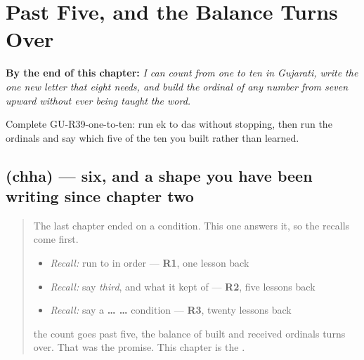 
\chapter{Past Five, and the Balance Turns Over}
\label{ch:gu-six-to-ten}

\begin{chapteropening}
\textbf{By the end of this chapter:} \emph{I can count from one to ten in Gujarati, write the one new letter that eight needs, and build the ordinal of any number from seven upward without ever being taught the word.}

Complete GU-R39-one-to-ten: run ek to das without stopping, then run the ordinals and say which five of the ten you built rather than learned.
\end{chapteropening}

\section[\texorpdfstring{\gu{છ} (chha)}{છ (chha)}]{ (chha) — six, and a shape you have been writing since chapter two}

\label{lesson:GU-C39-chha}



\begin{quote}
The last chapter ended on a condition. This one answers it, so the recalls come first.

\begin{itemize}
\raggedright
  \item \emph{Recall:} run \textbf{} to \textbf{} in order — \textbf{R1}, one lesson back
  \item \emph{Recall:} say \emph{third}, and what it kept of \textbf{} — \textbf{R2}, five lessons back
  \item \emph{Recall:} say a \textbf{ …  …} condition — \textbf{R3}, twenty lessons back
\end{itemize}

\textbf{} the count goes past five, \textbf{} the balance of built and received ordinals turns over. That was the promise. This chapter is the \textbf{}.
\end{quote}

